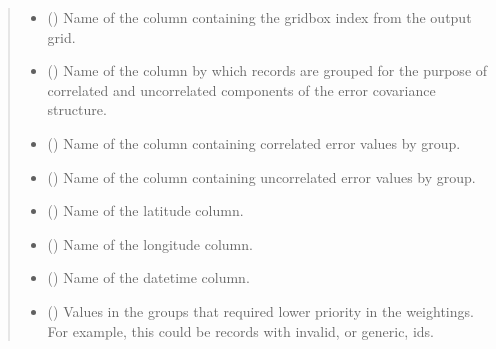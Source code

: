 \documentclass[letterpaper,10pt,english]{sphinxmanual}
\begin{document}
\begin{fulllineitems}
\begin{quote}
\begin{description}
\begin{itemize}
\item {}
\sphinxAtStartPar
{} () \textendash{} Name of the column containing the gridbox index from the output grid.

\item {}
\sphinxAtStartPar
{} () \textendash{} Name of the column by which records are grouped for the purpose of
correlated and uncorrelated components of the error covariance
structure.

\item {}
\sphinxAtStartPar
{} () \textendash{} Name of the column containing correlated error values by group.

\item {}
\sphinxAtStartPar
{} () \textendash{} Name of the column containing uncorrelated error values by group.

\item {}
\sphinxAtStartPar
{} () \textendash{} Name of the latitude column.

\item {}
\sphinxAtStartPar
{} () \textendash{} Name of the longitude column.

\item {}
\sphinxAtStartPar
{} () \textendash{} Name of the datetime column.

\item {}
\sphinxAtStartPar
{} () \textendash{} Values in the groups that required lower priority in the weightings.
For example, this could be records with invalid, or generic, ids.


\end{itemize}
\end{description}
\end{quote}
\end{fulllineitems}
\end{document}
